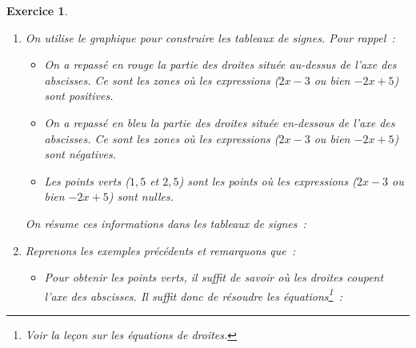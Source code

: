 \documentclass[10pt]{article}
\newtheorem{exo}{Exercice}
\begin{document}
\begin{exo}
\begin{enumerate}
\item On utilise le graphique pour construire les tableaux de signes. Pour rappel~:
\begin{itemize}
\item[\textbullet] On a repassé en rouge la partie des droites située au-dessus de l'axe des abscisses. Ce sont les zones où les expressions ($2x-3$ ou bien $-2x+5$) sont positives.
\item[\textbullet] On a repassé en bleu la partie des droites située en-dessous de l'axe des abscisses. Ce sont les zones où les expressions ($2x-3$ ou bien $-2x+5$) sont négatives.
\item[\textbullet] Les points verts ($1,5$ et $2,5$) sont les points où les expressions ($2x-3$ ou bien $-2x+5$) sont nulles.
\end{itemize}

\medskip

On résume ces informations dans les tableaux de signes~:

\setlength{\columnseprule}{1pt}

\begin{multicols}{2}

\begin{center}
\end{center}

\columnbreak

\begin{center}

\end{center}

\end{multicols}


\item Reprenons les exemples précédents et remarquons que~:

\begin{itemize}
\item[\textbullet] Pour obtenir les points verts, il suffit de savoir où les droites coupent l'axe des abscisses. Il suffit donc de résoudre les équations\footnote{Voir la leçon sur les équations de droites.}~:

\setlength{\columnseprule}{1pt}


\end{itemize}
\end{enumerate}
\end{exo}
\end{document}
